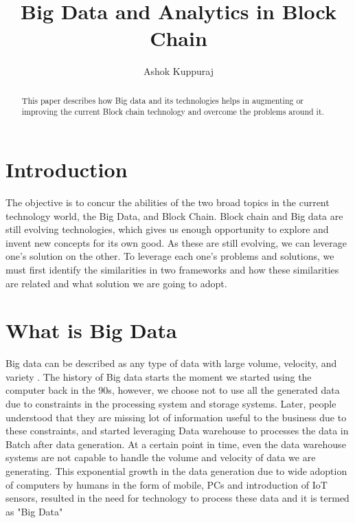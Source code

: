 \documentclass[sigconf]{acmart}
\begin{document}
\title{Big Data and Analytics in Block Chain}


\author{Ashok Kuppuraj}


\renewcommand{\shortauthors}{G. v. Laszewski}


\begin{abstract}
This paper describes how Big data and its technologies helps in augmenting or improving the current Block chain technology and overcome  the problems around it.
\end{abstract}



\maketitle


\section{Introduction}
The objective is to concur the abilities of the two broad topics in the current technology world, the Big Data, and Block Chain. Block chain and Big data are still evolving technologies, which gives us enough opportunity to explore and invent new concepts for its own good. As these are still evolving, we can leverage one's solution on the other.  To leverage each one's problems and solutions, we must first identify the similarities in  two frameworks and how these similarities are related and what solution we are going to adopt. 

\section{What is Big Data}
Big data can be described as any type of data with large volume, velocity, and variety \cite{Bigdataintro}. The history of Big data starts the moment we started using the computer back in the 90s, however, we choose not to use all the generated data due to constraints in the processing system and storage systems. Later, people understood that they are missing lot of information useful to the business due to these constraints, and started leveraging Data warehouse to processes the data in Batch after data generation. At a certain point in time, even the data warehouse systems are not capable to handle the volume and velocity of data we are generating. This exponential growth in the data generation due to wide adoption of computers by humans in the form of mobile, PCs and introduction of IoT sensors, resulted in the need for technology to process these data and it is termed as  "Big Data" \cite{datagrowth}
\end{document}
